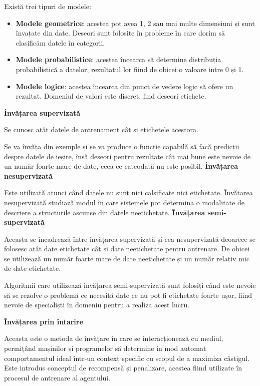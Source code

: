 \documentclass[a4paper, 12pt]{article}
\begin{document}
	\bigskip	
	Există trei tipuri de modele:
	\begin{itemize}
		\item\textbf{Modele geometrice}: acestea pot avea 1, 2 sau mai multe dimensiuni și sunt învațate din date. Deseori sunt folosite în probleme în care dorim să clasificăm datele în categorii.
		\item\textbf{Modele probabilistice}: acestea încearca să determine distribuția probabilistică a datelor, rezultatul lor fiind de obicei o valoare intre 0 și 1.
		\item\textbf{Modele logice}: acestea încearca din punct de vedere logic să ofere un rezultat. Domeniul de valori este discret, find deseori etichete.
	\end{itemize}
	
	\begin{outline}[enumerate]
		\1 \textbf{Învățarea supervizată}
		
		\bigskip
		\quad\space Se cunosc atât datele de antrenament cât și etichetele acestora.
		
		\quad\space Se va învăța din exemple și se va produce o funcție capabilă să facă predicții despre datele de ieșire, însă deseori pentru rezultate cât mai bune este nevoie de un număr foarte mare de date, ceea ce cateodată nu este posibil. \textbf{\cite{expert_system_2017}}
		\1 \textbf{Învățarea nesupervizată} 
		
		\bigskip
		\quad\space Este utilizată atunci când datele nu sunt nici calsificate nici etichetate. Învătarea nesupervizată studiază modul în care sistemele pot determina o modalitate de descriere a structurile ascunse din datele neetichetate.\textbf{\cite{expert_system_2017}}
		\1 \textbf{Învățarea semi-supervizată} 
		
		\bigskip
		\quad\space Aceasta se încadrează între învățarea supervizată și cea nesupervizată deoarece se folosesc atât date etichetate cât și date neetichetate pentru antrenare. De obicei se utilizează un număr foarte mare de date neetichetate și un număr relativ mic de date etichetate.
		
		\quad\space Algoritmii care utilizează învățarea semi-supervizată sunt folosiți când este nevoie să se rezolve o problemă ce necesită date ce nu pot fi etichetate foarte ușor, fiind nevoie de specialiști în domeniu pentru a realiza acest lucru.\textbf{\cite{expert_system_2017}}
		
		\1 \textbf{Învățarea prin întarire}
		
		\quad\space Aceasta este o metoda de învățare în care se interacționează cu mediul, permițând  mașinilor și programelor să determine în mod automat comportamentul ideal într-un context specific cu scopul de a maximiza câstigul. Este introdus conceptul de recompensă și penalizare, acestea fiind utilizate în procesul de antrenare al agentului.\textbf{\cite{expert_system_2017}}
	\end{outline}
	
\end{document}
